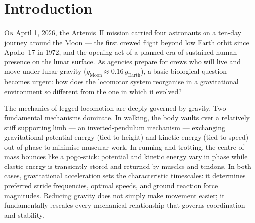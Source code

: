 \documentclass[blue]{enslyonstage}
\begin{document}

\fairepagedegarde

\faireabstract

\section{Introduction}
\label{sec:intro}

\paragraph{}
\lettrine[lines=3]{O}{n} April 1, 2026, the Artemis~II mission carried four
astronauts on a ten-day journey around the Moon --- the first crewed flight
beyond low Earth orbit since Apollo~17 in 1972, and the opening act of a
planned era of sustained human presence on the lunar surface. As agencies
prepare for crews who will live and move under lunar gravity
($g_\text{Moon} \approx 0.16\,g_\text{Earth}$), a basic biological question
becomes urgent: how does the locomotor system reorganise in a gravitational
environment so different from the one in which it evolved?

The mechanics of legged locomotion are deeply governed by gravity. Two
fundamental mechanisms dominate. In walking, the body vaults over a relatively
stiff supporting limb --- an inverted-pendulum mechanism --- exchanging
gravitational potential energy (tied to height) and kinetic energy (tied to
speed) out of phase to minimise muscular
work\cite{lacquanitiHumanLocomotionHypogravity2017a}. In running and trotting,
the centre of mass bounces like a pogo-stick: potential and kinetic energy vary
in phase while elastic energy is transiently stored and returned by muscles and
tendons\cite{lacquanitiHumanLocomotionHypogravity2017a}. In both cases,
gravitational acceleration sets the characteristic timescales: it determines
preferred stride frequencies, optimal speeds, and ground reaction force
magnitudes. Reducing gravity does not simply make movement easier; it
fundamentally rescales every mechanical relationship that governs coordination
and stability.
\end{document}
